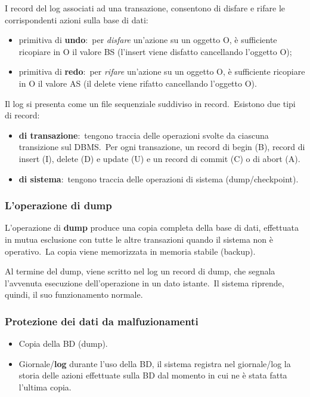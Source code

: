 \noindent I record del log associati ad una transazione, consentono di disfare e rifare le corrispondenti azioni sulla base di dati:
\begin{itemize}
	\item primitiva di \textbf{undo}:\ per \textit{disfare} un'azione su un oggetto O, è sufficiente ricopiare in O il valore BS (l'insert viene disfatto cancellando l'oggetto O);
	\item primitiva di \textbf{redo}:\ per \textit{rifare} un'azione su un oggetto O, è sufficiente ricopiare in O il valore AS (il delete viene rifatto cancellando l'oggetto O).
\end{itemize}

\noindent Il log si presenta come un file sequenziale suddiviso in record.\
Esistono due tipi di record:\
\begin{itemize}
	\item\textbf{di transazione}:\ tengono traccia delle operazioni svolte da ciascuna transizione sul DBMS.\ Per ogni transazione, un record di begin (B), record di insert (I), delete (D) e update (U) e un record di commit (C) o di abort (A).
	\item\textbf{di sistema}:\ tengono traccia delle operazioni di sistema (dump{\slash}check\-point).
\end{itemize}

\subsubsection{L'operazione di dump}

L'operazione di \textbf{dump} produce una copia completa della base di dati, effettuata in mutua esclusione con tutte le altre transazioni quando il sistema non è operativo.\
La copia viene memorizzata in memoria stabile (backup).\

Al termine del dump, viene scritto nel log un record di dump, che segnala l'avvenuta esecuzione dell'operazione in un dato istante.\
Il sistema riprende, quindi, il suo funzionamento normale.

\subsubsection{Protezione dei dati da malfuzionamenti}

\begin{itemize}
	\item Copia della BD (dump).
	\item Giornale/\textbf{log} durante l'uso della BD, il sistema registra nel giornale/log la storia delle azioni effettuate sulla BD dal momento in cui ne è stata fatta l'ultima copia.
\end{itemize}

